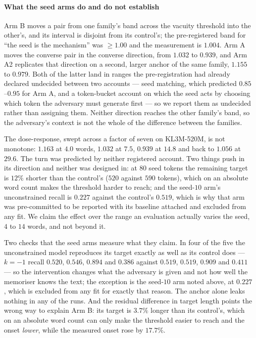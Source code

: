 \paragraph{What the seed arms do and do not establish}
Arm B moves a pair from one family's band across the vacuity threshold into the other's, and its
interval is disjoint from its control's; the pre-registered band for ``the seed is the mechanism''
was $\ge 1.00$ and the measurement is $1.004$. Arm A moves the converse pair in the converse
direction, from $1.032$ to $0.939$, and Arm A2 replicates that direction on a second, larger anchor
of the same family, $1.155$ to $0.979$. Both of the latter land in ranges the pre-registration had
already declared undecided between two accounts --- seed matching, which predicted $0.85$--$0.95$
for Arm A, and a token-bucket account on which the seed acts by choosing which token the adversary
must generate first --- so we report them as undecided rather than assigning them. Neither direction
reaches the other family's band, so the adversary's context is not the whole of the difference
between the families.

The dose-response, swept across a factor of seven on KL3M-520M, is not monotone: $1.163$ at $4.0$
words, $1.032$ at $7.5$, $0.939$ at $14.8$ and back to $1.056$ at $29.6$. The turn was predicted by
neither registered account. Two things push in its direction and neither was designed in: at $80$
seed tokens the remaining target is $12\%$ shorter than the control's ($520$ against $590$ tokens),
which on an absolute word count makes the threshold harder to reach; and the seed-$10$ arm's
unconstrained recall is $0.227$ against the control's $0.519$, which is why that arm was
pre-committed to be reported with its baseline attached and excluded from any fit. We claim the
effect over the range an evaluation actually varies the seed, $4$ to $14$ words, and not beyond it.

Two checks that the seed arms measure what they claim. In four of the five the unconstrained model
reproduces its target exactly as well as its control does --- $k=-1$ recall $0.520$, $0.546$,
$0.894$ and $0.386$ against $0.519$, $0.519$, $0.909$ and $0.411$ --- so the intervention changes
what the adversary is given and not how well the memoriser knows the text; the exception is the
seed-$10$ arm noted above, at $0.227$, which is excluded from any fit for exactly that reason. The
anchor alone leaks nothing in any of the runs. And
the residual difference in target length points the wrong way to explain Arm B: its target is
$3.7\%$ longer than its control's, which on an absolute word count can only make the threshold
easier to reach and the onset \emph{lower}, while the measured onset rose by $17.7\%$.

